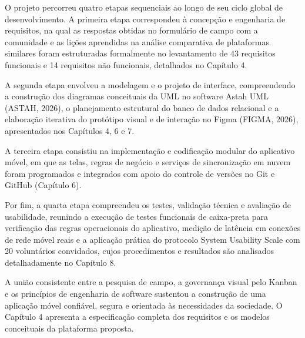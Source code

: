 O projeto percorreu quatro etapas sequenciais ao longo de seu ciclo global de desenvolvimento. A primeira etapa correspondeu à concepção e engenharia de requisitos, na qual as respostas obtidas no formulário de campo com a comunidade e as lições aprendidas na análise comparativa de plataformas similares foram estruturadas formalmente no levantamento de 43 requisitos funcionais e 14 requisitos não funcionais, detalhados no Capítulo 4.

A segunda etapa envolveu a modelagem e o projeto de interface, compreendendo a construção dos diagramas conceituais da UML no software Astah UML (ASTAH, 2026), o planejamento estrutural do banco de dados relacional e a elaboração iterativa do protótipo visual e de interação no Figma (FIGMA, 2026), apresentados nos Capítulos 4, 6 e 7.

A terceira etapa consistiu na implementação e codificação modular do aplicativo móvel, em que as telas, regras de negócio e serviços de sincronização em nuvem foram programados e integrados com apoio do controle de versões no Git e GitHub (Capítulo 6).

Por fim, a quarta etapa compreendeu os testes, validação técnica e avaliação de usabilidade, reunindo a execução de testes funcionais de caixa-preta para verificação das regras operacionais do aplicativo, medição de latência em conexões de rede móvel reais e a aplicação prática do protocolo System Usability Scale com 20 voluntários convidados, cujos procedimentos e resultados são analisados detalhadamente no Capítulo 8.

A união consistente entre a pesquisa de campo, a governança visual pelo Kanban e os princípios de engenharia de software sustentou a construção de uma aplicação móvel confiável, segura e orientada às necessidades da sociedade. O Capítulo 4 apresenta a especificação completa dos requisitos e os modelos conceituais da plataforma proposta.

\clearpage
